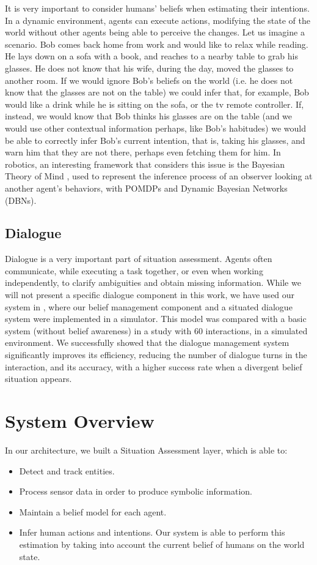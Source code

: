 It is very important to consider humans' beliefs when estimating their intentions. In a dynamic environment, agents can execute actions, modifying the state of the world without other agents being able to perceive the changes. Let us imagine a scenario. Bob comes back home from work and would like to relax while reading. He lays down on a sofa with a book, and reaches to a nearby table to grab his glasses. He does not know that his wife, during the day, moved the glasses to another room. If we would ignore Bob's beliefs on the world (i.e. he does not know that the glasses are not on the table) we could infer that, for example, Bob would like a drink while he is sitting on the sofa, or the tv remote controller. If, instead, we would know that Bob thinks his glasses are on the table (and we would use other contextual information perhaps, like Bob's habitudes) we would be able to correctly infer Bob's current intention, that is, taking his glasses, and warn him that they are not there, perhaps even fetching them for him. In robotics, an interesting framework that considers this issue is the Bayesian Theory of Mind \cite{baker2014modeling}, used to represent the inference process of an observer looking at another agent's behaviors, with POMDPs and Dynamic Bayesian Networks (DBNs).


\subsection{Dialogue}
Dialogue is a very important part of situation assessment. Agents often communicate, while executing a task together, or even when working independently, to clarify ambiguities and obtain missing information. While we will not present a specific dialogue component in this work, we have used our system in \cite{Ferreira2015}, where our belief management component and a situated dialogue system were implemented in a simulator. This model was compared with a basic system (without belief awareness) in a study with 60 interactions, in a simulated environment. We successfully showed that the dialogue management system significantly improves its efficiency, reducing the number of dialogue turns in the interaction, and its accuracy, with a higher success rate when a divergent belief situation appears.

\section{System Overview}
\label{sec:situation_assessment-overview}
In our architecture, we built a Situation Assessment layer, which is able to:
\begin{itemize}
\item  Detect and track entities.
\item  Process sensor data in order to produce symbolic information.
\item  Maintain a belief model for each agent.
\item  Infer human actions and intentions. Our system is able to perform this estimation by taking into account the current belief of humans on the world state. 
\end{itemize} 

